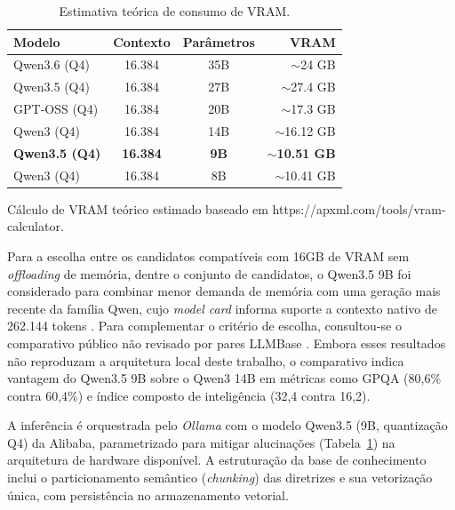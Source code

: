 \begin{table}[t!]
  \centering
  \begin{threeparttable}
  \caption{Estimativa teórica de consumo de VRAM.}
  \label{tab:latency_compatibility}
  \begin{tabular}{l c c r}
    \toprule
    \textbf{Modelo}       & \textbf{Contexto} & \textbf{Parâmetros} & \textbf{VRAM}           \\
    \midrule
    Qwen3.6 (Q4)          & 16.384            & 35B                 & $\sim$24 GB             \\
    Qwen3.5 (Q4)          & 16.384            & 27B                 & $\sim$27.4 GB           \\
    GPT-OSS (Q4)          & 16.384            & 20B                 & $\sim$17.3 GB           \\
    Qwen3 (Q4)            & 16.384            & 14B                 & $\sim$16.12 GB          \\
    \textbf{Qwen3.5 (Q4)} & \textbf{16.384}   & \textbf{9B}         & \textbf{$\sim$10.51 GB} \\
    Qwen3 (Q4)            & 16.384            & 8B                  & $\sim$10.41 GB          \\
    \bottomrule
  \end{tabular}
  \begin{tablenotes}
    \footnotesize
    \item[*] Cálculo de VRAM teórico estimado baseado em https://apxml.com/tools/vram-calculator.
  \end{tablenotes}
  \end{threeparttable}
\end{table}

Para a escolha entre os candidatos compatíveis com 16GB de VRAM sem \textit{offloading} de memória, dentre o conjunto de candidatos, o Qwen3.5 9B foi considerado para combinar menor demanda de memória com uma geração mais recente da família Qwen, cujo \textit{model card} informa suporte a contexto nativo de 262.144 tokens \cite{Qwen35ModelCard2026}.
Para complementar o critério de escolha, consultou-se o comparativo público não revisado por pares LLMBase \cite{benchmarks_llm}. Embora esses resultados não reproduzam a arquitetura local deste trabalho, o comparativo indica vantagem do Qwen3.5 9B sobre o Qwen3 14B em métricas como GPQA (80,6\% contra 60,4\%) e índice composto de inteligência (32,4 contra 16,2).

A inferência é orquestrada pelo \textit{Ollama} com o modelo Qwen3.5 (9B, quantização Q4) da Alibaba, parametrizado para mitigar alucinações 
(Tabela~\ref{tab:latency_compatibility}) na arquitetura de hardware disponível.
A estruturação da base de conhecimento inclui o particionamento semântico (\textit{chunking}) das diretrizes e sua vetorização única, com persistência no armazenamento vetorial.

